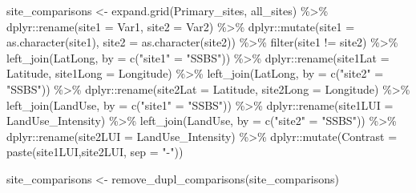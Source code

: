 \documentclass[
]{article}
\newenvironment{Shaded}{\begin{snugshade}}{\end{snugshade}}
\newcommand{\AttributeTok}[1]{\textcolor[rgb]{0.77,0.63,0.00}{#1}}
\newcommand{\FunctionTok}[1]{\textcolor[rgb]{0.00,0.00,0.00}{#1}}
\newcommand{\NormalTok}[1]{#1}
\newcommand{\OtherTok}[1]{\textcolor[rgb]{0.56,0.35,0.01}{#1}}
\newcommand{\SpecialCharTok}[1]{\textcolor[rgb]{0.00,0.00,0.00}{#1}}
\newcommand{\StringTok}[1]{\textcolor[rgb]{0.31,0.60,0.02}{#1}}
\begin{document}
\begin{Shaded}
\begin{Highlighting}[]
\NormalTok{  site\_comparisons }\OtherTok{\textless{}{-}} \FunctionTok{expand.grid}\NormalTok{(Primary\_sites, all\_sites) }\SpecialCharTok{\%\textgreater{}\%} 
\NormalTok{    dplyr}\SpecialCharTok{::}\FunctionTok{rename}\NormalTok{(}\AttributeTok{site1 =}\NormalTok{ Var1, }\AttributeTok{site2 =}\NormalTok{ Var2) }\SpecialCharTok{\%\textgreater{}\%}\NormalTok{ dplyr}\SpecialCharTok{::}\FunctionTok{mutate}\NormalTok{(}\AttributeTok{site1 =} \FunctionTok{as.character}\NormalTok{(site1), }\AttributeTok{site2 =} \FunctionTok{as.character}\NormalTok{(site2)) }\SpecialCharTok{\%\textgreater{}\%}
    \FunctionTok{filter}\NormalTok{(site1 }\SpecialCharTok{!=}\NormalTok{ site2) }\SpecialCharTok{\%\textgreater{}\%}
    \FunctionTok{left\_join}\NormalTok{(LatLong, }\AttributeTok{by =} \FunctionTok{c}\NormalTok{(}\StringTok{"site1"} \OtherTok{=} \StringTok{"SSBS"}\NormalTok{)) }\SpecialCharTok{\%\textgreater{}\%}\NormalTok{ dplyr}\SpecialCharTok{::}\FunctionTok{rename}\NormalTok{(}\AttributeTok{site1Lat =}\NormalTok{ Latitude, }\AttributeTok{site1Long =}\NormalTok{ Longitude) }\SpecialCharTok{\%\textgreater{}\%}
    \FunctionTok{left\_join}\NormalTok{(LatLong, }\AttributeTok{by =} \FunctionTok{c}\NormalTok{(}\StringTok{"site2"} \OtherTok{=} \StringTok{"SSBS"}\NormalTok{)) }\SpecialCharTok{\%\textgreater{}\%}\NormalTok{ dplyr}\SpecialCharTok{::}\FunctionTok{rename}\NormalTok{(}\AttributeTok{site2Lat =}\NormalTok{ Latitude, }\AttributeTok{site2Long =}\NormalTok{ Longitude) }\SpecialCharTok{\%\textgreater{}\%}
    \FunctionTok{left\_join}\NormalTok{(LandUse, }\AttributeTok{by =} \FunctionTok{c}\NormalTok{(}\StringTok{"site1"} \OtherTok{=} \StringTok{"SSBS"}\NormalTok{)) }\SpecialCharTok{\%\textgreater{}\%}\NormalTok{ dplyr}\SpecialCharTok{::}\FunctionTok{rename}\NormalTok{(}\AttributeTok{site1LUI =}\NormalTok{ LandUse\_Intensity) }\SpecialCharTok{\%\textgreater{}\%}
    \FunctionTok{left\_join}\NormalTok{(LandUse, }\AttributeTok{by =} \FunctionTok{c}\NormalTok{(}\StringTok{"site2"} \OtherTok{=} \StringTok{"SSBS"}\NormalTok{)) }\SpecialCharTok{\%\textgreater{}\%}\NormalTok{ dplyr}\SpecialCharTok{::}\FunctionTok{rename}\NormalTok{(}\AttributeTok{site2LUI =}\NormalTok{ LandUse\_Intensity) }\SpecialCharTok{\%\textgreater{}\%}
\NormalTok{    dplyr}\SpecialCharTok{::}\FunctionTok{mutate}\NormalTok{(}\AttributeTok{Contrast =} \FunctionTok{paste}\NormalTok{(site1LUI,site2LUI, }\AttributeTok{sep =} \StringTok{"{-}"}\NormalTok{))}
    
  
\NormalTok{  site\_comparisons }\OtherTok{\textless{}{-}} \FunctionTok{remove\_dupl\_comparisons}\NormalTok{(site\_comparisons)}
  

\end{Highlighting}
\end{Shaded}
\end{document}
